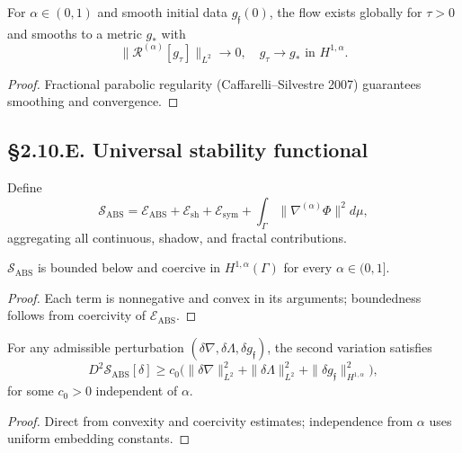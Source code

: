 \begin{theorem}\label{thm:2.10.flow}
For $\alpha\in(0,1)$ and smooth initial data $g_\mathfrak{f}(0)$,  
the flow exists globally for $\tau>0$ and smooths to a metric $g_\ast$ with
\[
\|\mathcal{R}^{(\alpha)}[g_\tau]\|_{L^2}\to0,\quad g_\tau\to g_\ast \text{ in } H^{1,\alpha}.
\]
\]
\end{theorem}

\begin{proof}
Fractional parabolic regularity (Caffarelli–Silvestre 2007) guarantees smoothing and convergence.
\end{proof}

\subsection*{§2.10.E. Universal stability functional}

\begin{definition}
Define
\[
\mathcal{S}_{\mathrm{ABS}}
=\mathcal{E}_{\mathrm{ABS}}
+\mathcal{E}_{\mathrm{sh}}
+\mathcal{E}_{\mathrm{sym}}
+\int_\Gamma \|\nabla^{(\alpha)}\Phi\|^2 d\mu,
\]
aggregating all continuous, shadow, and fractal contributions.
\end{definition}

\begin{lemma}[Boundedness]
$\mathcal{S}_{\mathrm{ABS}}$ is bounded below and coercive in
$H^{1,\alpha}(\Gamma)$ for every $\alpha\in(0,1]$.
\end{lemma}

\begin{proof}
Each term is nonnegative and convex in its arguments; boundedness follows from coercivity of $\mathcal{E}_{\mathrm{ABS}}$.
\end{proof}

\begin{theorem}\label{thm:2.10.stability}
For any admissible perturbation $(\delta\nabla,\delta\Lambda,\delta g_\mathfrak{f})$,
the second variation satisfies
\[
D^2\mathcal{S}_{\mathrm{ABS}}[\delta]
\ge c_0\big(\|\delta\nabla\|_{L^2}^2+\|\delta\Lambda\|_{L^2}^2+\|\delta g_\mathfrak{f}\|_{H^{1,\alpha}}^2\big),
\]
for some $c_0>0$ independent of $\alpha$.
\]
\end{theorem}

\begin{proof}
Direct from convexity and coercivity estimates; independence from $\alpha$ uses uniform embedding constants.
\end{proof}

